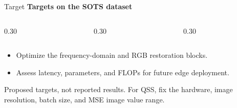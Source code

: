 \documentclass[aspectratio=169,10pt]{beamer}
\newcommand{\key}[1]{\textbf{\color{uetblue}#1}}
\begin{document}
\begin{frame}{Target}
  {\small\key{Targets on the SOTS dataset}}
  \vspace{0.24cm}
  \begin{columns}[T,onlytextwidth]
    \begin{column}{0.30\textwidth}
    \end{column}
    \begin{column}{0.30\textwidth}
    \end{column}
    \begin{column}{0.30\textwidth}
    \end{column}
  \end{columns}
  \vspace{0.30cm}
  \begin{itemize}
    \setlength{\itemsep}{0.13cm}
    \item Optimize the frequency-domain and RGB restoration blocks.
    \item Assess latency, parameters, and FLOPs for future edge deployment.
  \end{itemize}
  \vspace{0.10cm}
  {\scriptsize\color{uetgray}Proposed targets, not reported results. For QSS, fix the hardware, image resolution, batch size, and MSE image value range.}
\end{frame}
\end{document}
